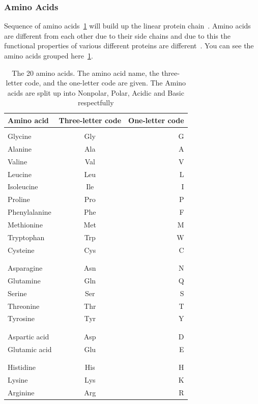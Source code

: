 \documentclass[]{final_report}
\begin{document}
\subsubsection{Amino Acids}

Sequence of amino acids~\ref{Amino acids} will build up the linear protein chain~\cite{zvelebil_understanding_2008}. Amino acids are different from each other due to their side chains and due to this the functional properties of various different proteins are different~\cite{zvelebil_understanding_2008}. You can see the amino acids grouped here~\ref{Amino acids}.
\vspace{80px}

\begin{table}[h!]
    \begin{center}\label{tab:Amino acids}
        \begin{tabular}{l|c|r}
        Amino acid & Three-letter code & One-letter code\\
        \hline
        \\
        Glycine & Gly & G\\
        Alanine & Ala & A\\
        Valine & Val & V\\
        Leucine & Leu & L\\
        Isoleucine & Ile & I\\
        Proline & Pro & P\\
        Phenylalanine & Phe & F\\
        Methionine & Met & M\\
        Tryptophan & Trp & W\\
        Cysteine & Cys & C\\
        \\
        \hline
        \\
        Asparagine & Asn & N\\
        Glutamine & Gln & Q\\
        Serine & Ser & S\\
        Threonine & Thr & T\\
        Tyrosine & Tyr & Y\\
        \\
        \hline
        \\
        Aspartic acid & Asp & D\\
        Glutamic acid & Glu & E\\
        \\
        \hline
        \\
        Histidine & His & H\\
        Lysine & Lys & K\\
        Arginine & Arg & R\\
        \end{tabular}
        \caption{\label{Amino acids}The 20 amino acids. The amino acid name, the three-letter code, and the one-letter code are given. The Amino acids are split up into Nonpolar, Polar, Acidic and Basic respectfully}
    \end{center}
\end{table}
\clearpage
\end{document}
